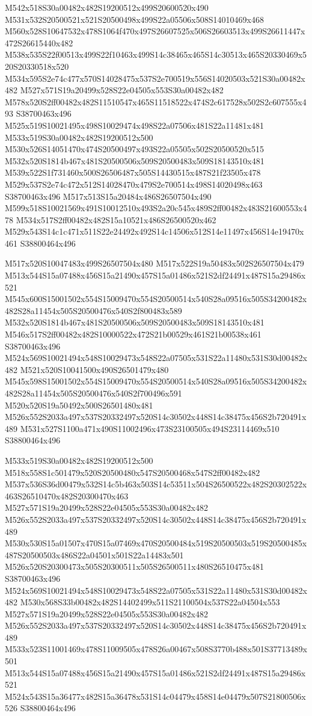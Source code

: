 \documentclass{article}
\begin{document}
\begin{multicols}{2}
M542x518S30a00482x482S19200512x499S20600520x490 M531x532S20500521x521S20500498x499S22a05506x508S14010469x468 M560x528S10647532x478S1064f470x497S26607525x506S26603513x499S26611447x472S26615440x482 M538x535S22f00513x499S22f10463x499S14c38465x465S14c30513x465S20330469x520S20330518x520 M534x595S2e74c477x570S14028475x537S2e700519x556S14020503x521S30a00482x482 M527x571S19a20499x528S22e04505x553S30a00482x482 M578x520S2ff00482x482S11510547x465S11518522x474S2c617528x502S2c607555x493 S38700463x496 M525x519S10021495x498S10029474x498S22a07506x481S22a11481x481 M533x519S30a00482x482S19200512x500 M530x526S14051470x474S20500497x493S22a05505x502S20500520x515 M532x520S1814b467x481S20500506x509S20500483x509S18143510x481 M539x522S1f731460x500S26506487x505S14430515x487S21f23505x478 M529x537S2e74c472x512S14028470x479S2e700514x498S14020498x463 S38700463x496 M517x513S15a20484x486S26507504x490 M599x518S10021569x491S10012510x493S2a20c545x489S2ff00482x483S21600553x478 M534x517S2ff00482x482S15a10521x486S26500520x462 M529x543S14c1c471x511S22e24492x492S14c14506x512S14e11497x456S14e19470x461 S38800464x496

M517x520S10047483x499S26507504x480 M517x522S19a50483x502S26507504x479 M513x544S15a07488x456S15a21490x457S15a01486x521S2df24491x487S15a29486x521 M545x600S15001502x554S15009470x554S20500514x540S28a09516x505S34200482x482S28a11454x505S20500476x540S2f800483x589 M532x520S1814b467x481S20500506x509S20500483x509S18143510x481 M546x517S2ff00482x482S10000522x472S21b00529x461S21b00538x461 S38700463x496 M524x569S10021494x548S10029473x548S22a07505x531S22a11480x531S30d00482x482 M521x520S10041500x490S26501479x480 M545x598S15001502x554S15009470x554S20500514x540S28a09516x505S34200482x482S28a11454x505S20500476x540S2f700496x591 M520x520S19a50492x500S26501480x481 M526x552S2033a497x537S20332497x520S14c30502x448S14c38475x456S2b720491x489 M531x527S1100a471x490S11002496x473S23100505x494S23114469x510 S38800464x496

M533x519S30a00482x482S19200512x500 M518x558S1c501479x520S20500480x547S20500468x547S2ff00482x482 M537x536S36d00479x532S14c5b463x503S14c53511x504S26500522x482S20302522x463S26510470x482S20300470x463 M527x571S19a20499x528S22e04505x553S30a00482x482 M526x552S2033a497x537S20332497x520S14c30502x448S14c38475x456S2b720491x489 M530x530S15a01507x470S15a07469x470S20500484x519S20500503x519S20500485x487S20500503x486S22a04501x501S22a14483x501 M526x520S20300473x505S20300511x505S26500511x480S26510475x481 S38700463x496 M524x569S10021494x548S10029473x548S22a07505x531S22a11480x531S30d00482x482 M530x568S33b00482x482S14402499x511S21100504x537S22a04504x553 M527x571S19a20499x528S22e04505x553S30a00482x482 M526x552S2033a497x537S20332497x520S14c30502x448S14c38475x456S2b720491x489 M533x523S11001469x478S11009505x478S26a00467x508S3770b488x501S37713489x501 M513x544S15a07488x456S15a21490x457S15a01486x521S2df24491x487S15a29486x521 M524x543S15a36477x482S15a36478x531S14c04479x458S14e04479x507S21800506x526 S38800464x496


\end{multicols}
\end{document}
